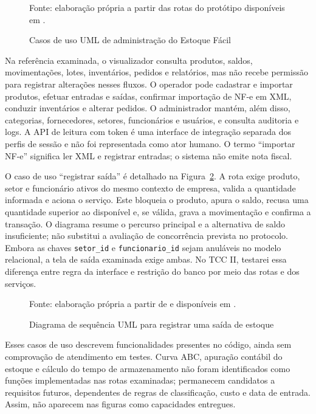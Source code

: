\begin{figure}[htb]
\centering
\resizebox{\textwidth}{!}{}
\caption{Casos de uso UML de administração do Estoque Fácil}
\label{fig:uml-administracao}
\par\smallskip
{\footnotesize Fonte: elaboração própria a partir das rotas do protótipo disponíveis em \cite{EstoqueFacilRepositorio}.}
\end{figure}

Na referência examinada, o visualizador consulta produtos, saldos, movimentações, lotes, inventários, pedidos e relatórios, mas não recebe permissão para registrar alterações nesses fluxos. O operador pode cadastrar e importar produtos, efetuar entradas e saídas, confirmar importação de NF-e em XML, conduzir inventários e alterar pedidos. O administrador mantém, além disso, categorias, fornecedores, setores, funcionários e usuários, e consulta auditoria e logs. A API de leitura com token é uma interface de integração separada dos perfis de sessão e não foi representada como ator humano. O termo ``importar NF-e'' significa ler XML e registrar entradas; o sistema não emite nota fiscal.

O caso de uso ``registrar saída'' é detalhado na Figura~\ref{fig:uml-saida}. A rota exige produto, setor e funcionário ativos do mesmo contexto de empresa, valida a quantidade informada e aciona o serviço. Este bloqueia o produto, apura o saldo, recusa uma quantidade superior ao disponível e, se válida, grava a movimentação e confirma a transação. O diagrama resume o percurso principal e a alternativa de saldo insuficiente; não substitui a avaliação de concorrência prevista no protocolo. Embora as chaves \texttt{setor\_id} e \texttt{funcionario\_id} sejam anuláveis no modelo relacional, a tela de saída examinada exige ambas. No TCC II, testarei essa diferença entre regra da interface e restrição do banco por meio das rotas e dos serviços.

\begin{figure}[htb]
\centering
\resizebox{\textwidth}{!}{}
\caption{Diagrama de sequência UML para registrar uma saída de estoque}
\label{fig:uml-saida}
\par\smallskip
{\footnotesize Fonte: elaboração própria a partir de  e  disponíveis em \cite{EstoqueFacilRepositorio}.}
\end{figure}

Esses casos de uso descrevem funcionalidades presentes no código, ainda sem comprovação de atendimento em testes. Curva ABC, apuração contábil do estoque e cálculo do tempo de armazenamento não foram identificados como funções implementadas nas rotas examinadas; permanecem candidatos a requisitos futuros, dependentes de regras de classificação, custo e data de entrada. Assim, não aparecem nas figuras como capacidades entregues.

